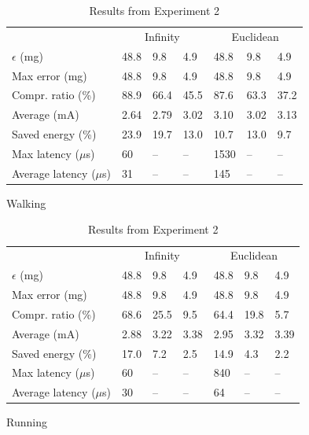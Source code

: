 \documentclass{report}
\begin{document}
\begin{table}[]
   \begin{subfigure}{\columnwidth}
   \centering
   \begin{tabular}{l|l|l|l|l|l|l}
   \hline
   \rowcolor{headcolor}
                          & \multicolumn{3}{c|}{Infinity} & \multicolumn{3}{c}{Euclidean} \\
   \rowcolor{headcolor}
   $\epsilon$ (mg)             & 48.8    & 9.8      & 4.9   & 48.8   & 9.8   & 4.9   \\
   \hline
   Max error (mg)              & 48.8    & 9.8      & 4.9   & 48.8   & 9.8   & 4.9   \\
   Compr.      ratio (\%)      & 88.9    & 66.4     & 45.5  & 87.6   & 63.3  & 37.2  \\
   Average (mA)                & 2.64    & 2.79     & 3.02  & 3.10   & 3.02  & 3.13  \\
   Saved energy (\%)           & 23.9    & 19.7     & 13.0  &  10.7  & 13.0  & 9.7   \\
   Max latency ($\mu$s)& 60      & --       & --    & 1530   & --    & --    \\
   Average latency ($\mu$s) & 31 & --       & --    & 145    & --    & --    \\    
   \hline
   \end{tabular}
   \caption{Walking}
   \end{subfigure}
   \begin{subfigure}{\columnwidth}
   \centering
   \begin{tabular}{l|l|l|l|l|l|l}
   \hline
   \rowcolor{headcolor}

                     & \multicolumn{3}{c|}{Infinity} & \multicolumn{3}{c}{Euclidean} \\
    \rowcolor{headcolor}
   $\epsilon$ (mg)        & 48.8       & 9.8      & 4.9       & 48.8      & 9.8    & 4.9    \\
   \hline
   Max error (mg)         & 48.8       & 9.8      & 4.9       & 48.8      & 9.8    & 4.9   \\
   Compr.      ratio (\%) & 68.6       & 25.5     & 9.5       & 64.4      & 19.8   & 5.7   \\
   Average (mA)        & 2.88     & 3.22   & 3.38     & 2.95    & 3.32    & 3.39   \\
   Saved energy (\%)      & 17.0    & 7.2    & 2.5   & 14.9   & 4.3   & 2.2\\
   Max latency ($\mu$s)& 60      & --       & --    & 840   & --    & --    \\
   Average latency ($\mu$s) & 30 & --       & --    & 64    & --    & --    \\    
   \hline
   \end{tabular}
   \caption{Running}
   \end{subfigure}
   \caption{Results from Experiment 2}
   \label{table:results-energy}
\end{table}
\end{document}
